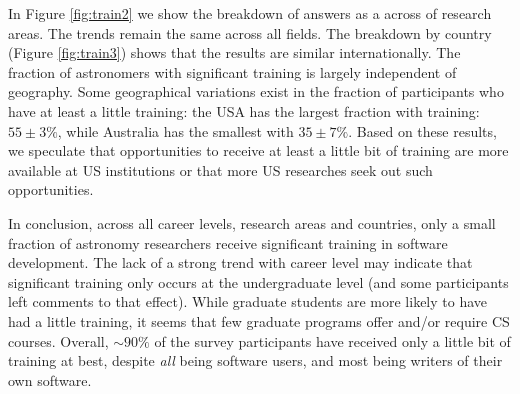 In Figure \ref{fig:train2} we show the breakdown of answers as a across of research areas. The trends remain the same across all fields.
The breakdown by country (Figure \ref{fig:train3}) shows that the results are similar internationally. The fraction of astronomers with significant training is largely independent of geography. Some geographical variations exist in the fraction of participants who have at least a little training: the USA has the largest fraction with training: $55\pm3\%$, while Australia has the smallest with $35\pm7\%$. Based on these results, we speculate that opportunities to receive at least a little bit of training are more available at US institutions or that more US researches seek out such opportunities. 

In conclusion, across all career levels, research areas and countries, only a small fraction of astronomy researchers receive significant training in software development. The lack of a strong trend with career level may indicate that significant training only occurs at the undergraduate level (and some participants left comments to that effect). While graduate students are more likely to have had a little training, it seems that few graduate programs offer and/or require CS courses. Overall, $\sim90\%$ of the survey participants have received only a little bit of training at best, despite \emph{all} being software users, and most being writers of their own software. 



    
    
    
  
  
  